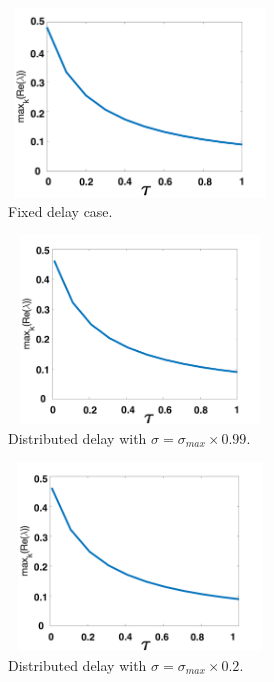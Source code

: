 \begin{figure}[H]
    \centering
    \begin{subfigure}[b]{0.45\textwidth}
        \centering
        \includegraphics[width=7cm,height=5cm]{p1fixed.png}
        \caption{Fixed delay case.}
        \label{}
    \end{subfigure}
    \hfill
    \begin{subfigure}[b]{0.45\textwidth}
        \centering
        \includegraphics[width=7cm,height=5cm]{p1sigmax.png}
        \caption{Distributed delay with $\sigma=\sigma_{max}\times0.99$.}
        \label{}
    \end{subfigure}
    \hfill
    \begin{subfigure}[b]{0.45\textwidth}
        \centering
        \includegraphics[width=7cm,height=5cm]{p1sigmax5.png}
        \caption{Distributed delay with $\sigma=\sigma_{max}\times0.2$.}
        \label{}
    \end{subfigure}
    \hfill
    \begin{subfigure}[b]{0.45\textwidth}

\end{subfigure}
\end{figure}
